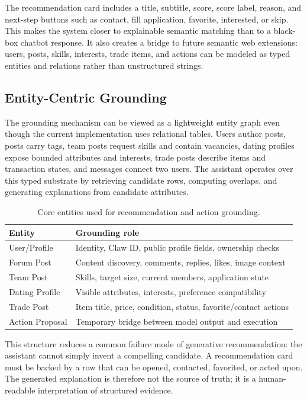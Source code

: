 \documentclass[sigconf]{acmart}
\begin{document}
The recommendation card includes a title, subtitle, score, score label, reason, and next-step buttons such as contact, fill application, favorite, interested, or skip. This makes the system closer to explainable semantic matching than to a black-box chatbot response. It also creates a bridge to future semantic web extensions: users, posts, skills, interests, trade items, and actions can be modeled as typed entities and relations rather than unstructured strings.

\subsection{Entity-Centric Grounding}
The grounding mechanism can be viewed as a lightweight entity graph even though the current implementation uses relational tables. Users author posts, posts carry tags, team posts request skills and contain vacancies, dating profiles expose bounded attributes and interests, trade posts describe items and transaction states, and messages connect two users. The assistant operates over this typed substrate by retrieving candidate rows, computing overlaps, and generating explanations from candidate attributes.

\begin{table}[t]
\centering
\caption{Core entities used for recommendation and action grounding.}
\label{tab:entities}
\begin{tabularx}{\linewidth}{lX}
\toprule
\textbf{Entity} & \textbf{Grounding role}\\
\midrule
User/Profile & Identity, Claw ID, public profile fields, ownership checks\\
Forum Post & Content discovery, comments, replies, likes, image context\\
Team Post & Skills, target size, current members, application state\\
Dating Profile & Visible attributes, interests, preference compatibility\\
Trade Post & Item title, price, condition, status, favorite/contact actions\\
Action Proposal & Temporary bridge between model output and execution\\
\bottomrule
\end{tabularx}
\end{table}

This structure reduces a common failure mode of generative recommendation: the assistant cannot simply invent a compelling candidate. A recommendation card must be backed by a row that can be opened, contacted, favorited, or acted upon. The generated explanation is therefore not the source of truth; it is a human-readable interpretation of structured evidence.
\end{document}
